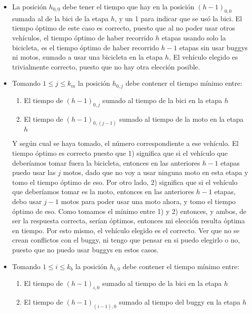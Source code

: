 \begin{itemize}
\begin{itemize}
		\item La posición $h_{0,0}$ debe tener el tiempo que hay en la posición $(h-1)_{0,0}$ sumada al de la bici de la etapa $h$, y un 1 para indicar que se usó la bici. El tiempo óptimo de este caso es correcto, puesto que al no poder usar otros vehículos, el tiempo óptimo de haber recorrido $h$ etapas usando solo la bicicleta, es el tiempo óptimo de haber recorrido $h-1$ etapas sin usar buggys ni motos, sumado a usar una bicicleta en la etapa $h$. El vehículo elegido es trivialmente correcto, puesto que no hay otra elección posible. 
		\item Tomando $1\leq j \leq k_{m}$ la posición $h_{0,j}$ debe contener el tiempo mínimo entre:
		\begin{enumerate}
			\item El tiempo de $(h-1)_{0,j}$ sumado al tiempo de la bici en la etapa $h$
			\item El tiempo de $(h-1)_{0,(j-1)}$ sumado al tiempo de la moto en la etapa $h$
		\end{enumerate} 
		Y según cual se haya tomado, el número correspondiente a ese vehículo. El tiempo óptimo es correcto puesto que 1) significa que si el vehículo que deberíamos tomar fuera la bicicleta, entonces en las anteriores $h-1$ etapas puedo usar las $j$ motos, dado que no voy a usar ninguna moto en esta etapa y tomo el tiempo óptimo de eso. Por otro lado, 2) significa que si el vehículo que deberíamos tomar es la moto, entonces en las anteriores $h-1$ etapas, debo usar $j-1$ motos para poder usar una moto ahora, y tomo el tiempo óptimo de eso. Como tomamos el mínimo entre 1) y 2) entonces, y ambos, de ser la respuesta correcta, serían óptimos, entonces mi elección resulta óptima en tiempo. Por esto mismo, el vehículo elegido es el correcto. Ver que no se crean conflictos con el buggy, ni tengo que pensar en si puedo elegirlo o no, puesto que no puedo usar buggys en estos casos.
		\item Tomando $1\leq i \leq k_{b}$ la posición $h_{i,0}$ debe contener el tiempo mínimo entre:
		\begin{enumerate}
			\item El tiempo de $(h-1)_{i,0}$ sumado al tiempo de la bici en la etapa $h$
			\item El tiempo de $(h-1)_{(i-1),0}$ sumado al tiempo del buggy en la etapa $h$
		\end{enumerate} 

\end{itemize}
\end{itemize}
